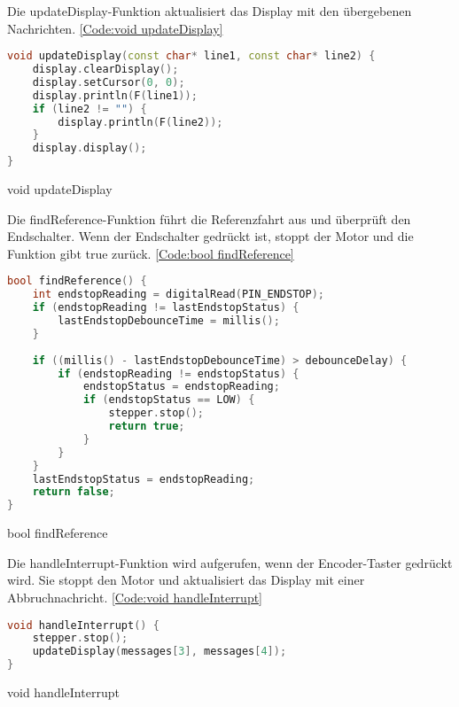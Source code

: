 Die updateDisplay-Funktion aktualisiert das Display mit den übergebenen Nachrichten. \ref{Code:void updateDisplay}

\begin{code}
	\begin{lstlisting}[language=c++]
void updateDisplay(const char* line1, const char* line2) {
	display.clearDisplay();
	display.setCursor(0, 0);
	display.println(F(line1));
	if (line2 != "") {
		display.println(F(line2));
	}
	display.display();
}
\end{lstlisting}      

\caption[void updateDisplay]{void updateDisplay}\label{Code:void updateDisplay}    
\end{code}

Die findReference-Funktion führt die Referenzfahrt aus und überprüft den Endschalter. Wenn der Endschalter gedrückt ist, stoppt der Motor und die Funktion gibt true zurück. \ref{Code:bool findReference}

\begin{code}
	\begin{lstlisting}[language=c++]
bool findReference() {
	int endstopReading = digitalRead(PIN_ENDSTOP);
	if (endstopReading != lastEndstopStatus) {
		lastEndstopDebounceTime = millis();
	}
	
	if ((millis() - lastEndstopDebounceTime) > debounceDelay) {
		if (endstopReading != endstopStatus) {
			endstopStatus = endstopReading;
			if (endstopStatus == LOW) {
				stepper.stop();
				return true;
			}
		}
	}
	lastEndstopStatus = endstopReading;
	return false;
}
\end{lstlisting}      

\caption[bool findReference]{bool findReference}\label{Code:bool findReference}    
\end{code}

Die handleInterrupt-Funktion wird aufgerufen, wenn der Encoder-Taster gedrückt wird. Sie stoppt den Motor und aktualisiert das Display mit einer Abbruchnachricht. \ref{Code:void handleInterrupt}

\begin{code}
	\begin{lstlisting}[language=c++]
void handleInterrupt() {
	stepper.stop();
	updateDisplay(messages[3], messages[4]);
}
\end{lstlisting}      

\caption[void handleInterrupt]{void handleInterrupt}\label{Code:void handleInterrupt}    
\end{code}

